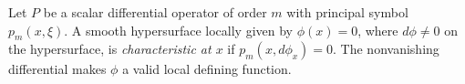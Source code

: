 
Let $P$ be a scalar differential operator of order $m$ with principal symbol $p_m(x,\xi)$. A smooth hypersurface locally given by $\phi(x)=0$, where $d\phi\ne0$ on the hypersurface, is \emph{characteristic at $x$} if $p_m(x,d\phi_x)=0$. The nonvanishing differential makes $\phi$ a valid local defining function.
